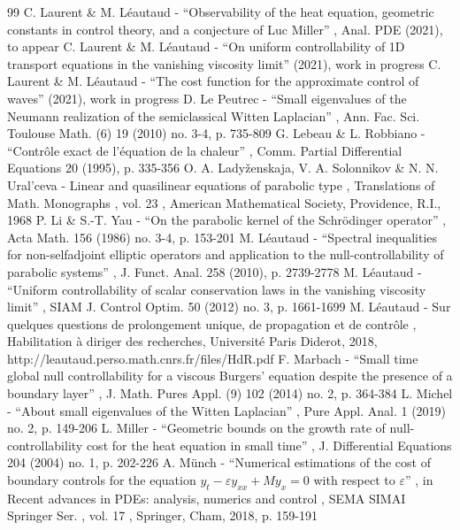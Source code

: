 \begin{thebibliography}{99}
 C. Laurent \& M. Léautaud - “Observability of the heat equation, geometric constants in control theory, and a conjecture of Luc Miller” , Anal. PDE (2021), to appear
 C. Laurent \& M. Léautaud - “On uniform controllability of 1D transport equations in the vanishing viscosity limit” (2021), work in progress
 C. Laurent \& M. Léautaud - “The cost function for the approximate control of waves” (2021), work in progress
 D. Le Peutrec - “Small eigenvalues of the Neumann realization of the semiclassical Witten Laplacian” , Ann. Fac. Sci. Toulouse Math. (6) 19 (2010) no. 3-4, p. 735-809
 G. Lebeau \& L. Robbiano - “Contrôle exact de l’équation de la chaleur” , Comm. Partial Differential Equations 20 (1995), p. 335-356
 O. A. Ladyženskaja, V. A. Solonnikov \& N. N. Ural’ceva - Linear and quasilinear equations of parabolic type , Translations of Math. Monographs , vol. 23 , American Mathematical Society, Providence, R.I., 1968
 P. Li \& S.-T. Yau - “On the parabolic kernel of the Schrödinger operator” , Acta Math. 156 (1986) no. 3-4, p. 153-201
 M. Léautaud - “Spectral inequalities for non-selfadjoint elliptic operators and application to the null-controllability of parabolic systems” , J. Funct. Anal. 258 (2010), p. 2739-2778
 M. Léautaud - “Uniform controllability of scalar conservation laws in the vanishing viscosity limit” , SIAM J. Control Optim. 50 (2012) no. 3, p. 1661-1699
 M. Léautaud - Sur quelques questions de prolongement unique, de propagation et de contrôle , Habilitation à diriger des recherches, Université Paris Diderot, 2018, http://leautaud.perso.math.cnrs.fr/files/HdR.pdf
 F. Marbach - “Small time global null controllability for a viscous Burgers’ equation despite the presence of a boundary layer” , J. Math. Pures Appl. (9) 102 (2014) no. 2, p. 364-384
 L. Michel - “About small eigenvalues of the Witten Laplacian” , Pure Appl. Anal. 1 (2019) no. 2, p. 149-206
 L. Miller - “Geometric bounds on the growth rate of null-controllability cost for the heat equation in small time” , J. Differential Equations 204 (2004) no. 1, p. 202-226
 A. Münch - “Numerical estimations of the cost of boundary controls for the equation $y_t-\varepsilon y_{xx}+My_x=0$ with respect to $\varepsilon $” , in Recent advances in PDEs: analysis, numerics and control , SEMA SIMAI Springer Ser. , vol. 17 , Springer, Cham, 2018, p. 159-191

\end{thebibliography}
